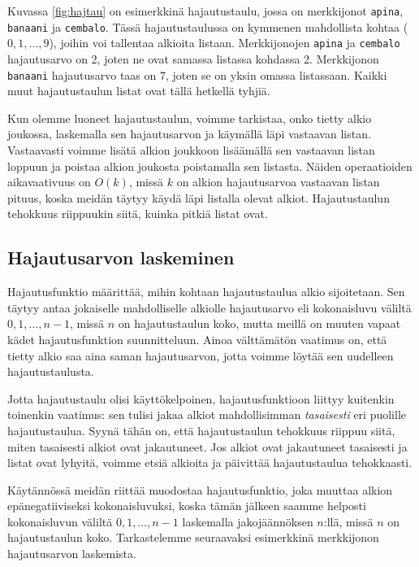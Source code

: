 Kuvassa \ref{fig:hajtau} on esimerkkinä hajautustaulu, jossa on
merkkijonot \texttt{apina}, \texttt{banaani} ja \texttt{cembalo}.
Tässä hajautustaulussa on kymmenen mahdollista kohtaa
($0,1,\ldots,9$), joihin voi tallentaa alkioita listaan.
Merkkijonojen \texttt{apina} ja \texttt{cembalo}
hajautusarvo on 2, joten ne ovat samassa listassa kohdassa 2.
Merkkijonon \texttt{banaani} hajautusarvo taas on 7,
joten se on yksin omassa listassaan.
Kaikki muut hajautustaulun listat ovat tällä hetkellä tyhjiä.

Kun olemme luoneet hajautustaulun, voimme tarkistaa,
onko tietty alkio joukossa, laskemalla sen hajautusarvon
ja käymällä läpi vastaavan listan.
Vastaavasti voimme lisätä alkion joukkoon
lisäämällä sen vastaavan listan loppuun ja poistaa
alkion joukosta poistamalla sen listasta.
Näiden operaatioiden aikavaativuus on $O(k)$,
missä $k$ on alkion hajautusarvoa vastaavan listan pituus,
koska meidän täytyy käydä läpi listalla olevat alkiot.
Hajautustaulun tehokkuus riippuukin siitä,
kuinka pitkiä listat ovat.

\subsection{Hajautusarvon laskeminen}

Hajautusfunktio määrittää, mihin kohtaan hajautustaulua
alkio sijoitetaan.
Sen täytyy antaa jokaiselle mahdolliselle alkiolle
hajautusarvo eli kokonaisluvu väliltä $0,1,\ldots,n-1$,
missä $n$ on hajautustaulun koko,
mutta meillä on muuten vapaat kädet hajautusfunktion suunnitteluun.
Ainoa välttämätön vaatimus on, että tietty alkio saa aina
saman hajautusarvon, jotta voimme löytää sen uudelleen
hajautustaulusta.

Jotta hajautustaulu olisi käyttökelpoinen, hajautusfunktioon
liittyy kuitenkin toinenkin vaatimus:
sen tulisi jakaa alkiot mahdollisimman \emph{tasaisesti}
eri puolille hajautustaulua.
Syynä tähän on, että hajautustaulun tehokkuus riippuu siitä,
miten tasaisesti alkiot ovat jakautuneet.
Jos alkiot ovat jakautuneet tasaisesti ja listat ovat lyhyitä,
voimme etsiä alkioita ja päivittää hajautustaulua tehokkaasti.

Käytännössä meidän riittää muodostaa hajautusfunktio,
joka muuttaa alkion epänegatiiviseksi kokonaisluvuksi,
koska tämän jälkeen saamme helposti kokonaisluvun
väliltä $0,1,\ldots,n-1$ laskemalla jakojäännöksen $n$:llä,
missä $n$ on hajautustaulun koko.
Tarkastelemme seuraavaksi esimerkkinä merkkijonon
hajautusarvon laskemista.

